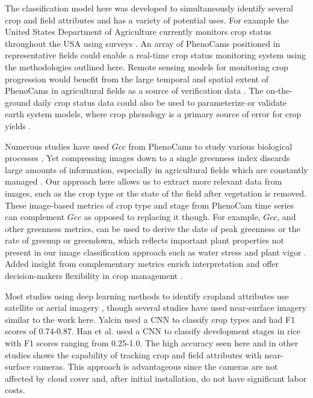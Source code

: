 \documentclass[remotesensing,article,submit,moreauthors,pdftex]{Definitions/mdpi}
\begin{document}
The classification model here was developed to simultaneously identify several crop and field attributes and has a variety of potential uses. For example the United States Department of Agriculture currently monitors crop status throughout the USA using surveys \citep{nass2012}. An array of PhenoCams positioned in representative fields could enable a real-time crop status monitoring system using the methodologies outlined here. Remote sensing models for monitoring crop progression would benefit from the large temporal and spatial extent of PhenoCams in agricultural fields as a source of verification data \citep{gao-zhang2021}. The on-the-ground  daily crop status data could also be used to parameterize or validate earth system models, where crop phenology is a primary source of error for crop yields \citep{lombardozzi2020}.  

Numerous studies have used $Gcc$ from PhenoCams to study various biological processes \citep{richardson2018b, richardson2019}. Yet compressing images down to a single greenness index discards large amounts of information, especially in agricultural fields which are constantly managed \citep{browning2021}. Our approach here allows us to extract more relevant data from images, such as the crop type or the state of the field after vegetation is removed. These image-based metrics of crop type and stage from PhenoCam time series can complement $Gcc$ as opposed to replacing it though. For example, $Gcc$, and other greenness metrics, can be used to derive the date of peak greenness or the rate of greenup or greendown, which reflects important plant properties not present in our image classification approach such as water stress and plant vigor \citep{sakamoto2010, aasen2020}. Added insight from complementary metrics enrich interpretation and offer decision-makers flexibility in crop management \citep{browning2021}.  

Most studies using deep learning methods to identify cropland attributes use satellite or aerial imagery \citep{benos2021}, though several studies have used near-surface imagery similar to the work here. Yalcin \citeyear{yalcin2017} used a CNN to classify crop types and had F1 scores of 0.74-0.87. Han et al. \citeyear{han-shi2021} used a CNN to classify development stages in rice with F1 scores ranging from 0.25-1.0.  The high accuracy seen here and in other studies shows the capability of tracking crop and field attributes with near-surface cameras. This approach is advantageous since the cameras are not affected by cloud cover and, after initial installation, do not have significant labor costs. 
\end{document}
